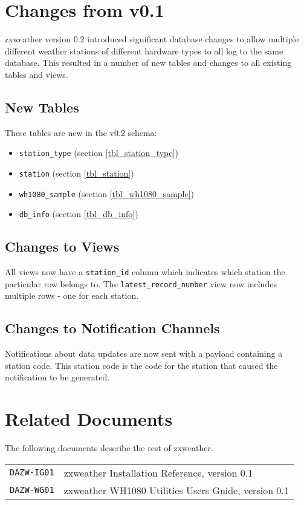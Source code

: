 \documentclass[a4paper,10pt]{book}
\begin{document}
\section{Changes from v0.1}
zxweather version 0.2 introduced significant database changes to allow multiple different weather stations of different hardware types to all log to the same database. This resulted in a number of new tables and changes to all existing tables and views.

\subsection{New Tables}
These tables are new in the v0.2 schema:
\begin{itemize}
\item \verb|station_type| (section \ref{tbl_station_type})
\item \verb|station| (section \ref{tbl_station})
\item \verb|wh1080_sample| (section \ref{tbl_wh1080_sample})
\item \verb|db_info| (section \ref{tbl_db_info})
\end{itemize}

\subsection{Changes to Views}
All views now have a \verb|station_id| column which indicates which station the particular row belongs to. The \verb|latest_record_number| view now includes multiple rows - one for each station.

\subsection{Changes to Notification Channels}
Notifications about data updates are now sent with a payload containing a station code. This station code is the code for the station that caused the notification to be generated.

\section{Related Documents}
The following documents describe the rest of zxweather.

\begin{tabular}{l l}
\verb|DAZW-IG01| & zxweather Installation Reference, version 0.1 \\
\verb|DAZW-WG01| & zxweather WH1080 Utilities Users Guide, version 0.1 \\
\end{tabular}
\end{document}
